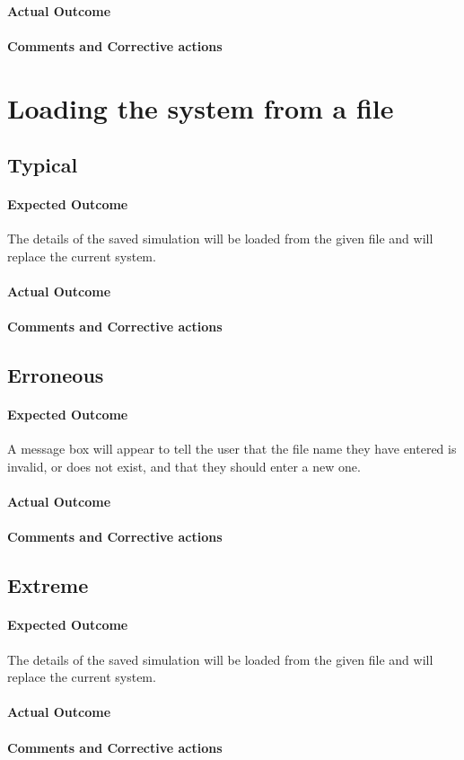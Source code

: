 \paragraph{Actual Outcome}
\paragraph{Comments and Corrective actions}


\section{Loading the system from a file}
\subsection{Typical}
\paragraph{Expected Outcome}
The details of the saved simulation will be loaded from the given file and will
replace the current system.
\paragraph{Actual Outcome}
\paragraph{Comments and Corrective actions}

\subsection{Erroneous}
\paragraph{Expected Outcome}
A message box will appear to tell the user that the file name they have entered
is invalid, or does not exist, and that they should enter a new one.
\paragraph{Actual Outcome}
\paragraph{Comments and Corrective actions}

\subsection{Extreme}
\paragraph{Expected Outcome}
The details of the saved simulation will be loaded from the given file and will
replace the current system.
\paragraph{Actual Outcome}
\paragraph{Comments and Corrective actions}


